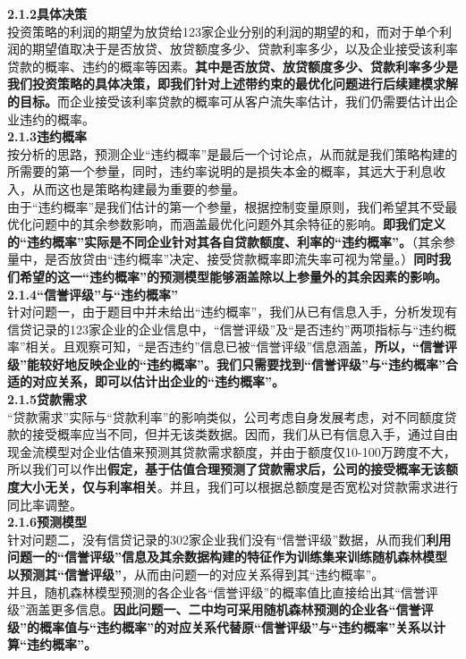 \documentclass[bwprint]{cumcm}
\begin{document}
  \noindent \textbf{2.1.2具体决策}\\
  \indent 投资策略的利润的期望为放贷给123家企业分别的利润的期望的和，而对于单个利润的期望值取决于是否放贷、放贷额度多少、贷款利率多少，以及企业接受该利率贷款的概率、违约的概率等因素。\textbf{其中是否放贷、放贷额度多少、贷款利率多少是我们投资策略的具体决策，即我们针对上述带约束的最优化问题进行后续建模求解的目标。}而企业接受该利率贷款的概率可从客户流失率估计，我们仍需要估计出企业违约的概率。\\
  
   \noindent \textbf{2.1.3违约概率}\\
    \indent 按分析的思路，预测企业“违约概率”是最后一个讨论点，从而就是我们策略构建的所需要的第一个参量，同时，违约率说明的是损失本金的概率，其远大于利息收入，从而这也是策略构建最为重要的参量。\\
    \indent 由于“违约概率”是我们估计的第一个参量，根据控制变量原则，我们希望其不受最优化问题中的其余参数影响，而涵盖最优化问题外其余特征的影响。\textbf{即我们定义的“违约概率”实际是不同企业针对其各自贷款额度、利率的“违约概率”。}（其余参量中，是否放贷由“违约概率”决定、接受贷款概率即流失率可视为常量。）\textbf{同时我们希望的这一“违约概率”的预测模型能够涵盖除以上参量外的其余因素的影响。}\\
    
   \noindent \textbf{2.1.4“信誉评级”与“违约概率”}\\
     \indent 针对问题一，由于题目中并未给出“违约概率”，我们从已有信息入手，分析发现有信贷记录的123家企业的企业信息中，“信誉评级”及“是否违约”两项指标与“违约概率”相关。且观察可知，“是否违约”信息已被“信誉评级”信息涵盖，\textbf{所以，“信誉评级”能较好地反映企业的“违约概率”。我们只需要找到“信誉评级”与“违约概率”合适的对应关系，即可以估计出企业的“违约概率”。}\\
  
      
   \noindent \textbf{2.1.5贷款需求}\\
\indent “贷款需求”实际与“贷款利率”的影响类似，公司考虑自身发展考虑，对不同额度贷款的接受概率应当不同，但并无该类数据。因而，我们从已有信息入手，通过自由现金流模型对企业估值来预测其贷款需求额度，并由于额度仅10-100万跨度不大，所以我们可以作出\textbf{假定，基于估值合理预测了贷款需求后，公司的接受概率无该额度大小无关，仅与利率相关}。并且，我们可以根据总额度是否宽松对贷款需求进行同比率调整。\\
   
   \noindent \textbf{2.1.6预测模型}\\
    \indent 针对问题二，没有信贷记录的302家企业我们没有“信誉评级”数据，从而我们\textbf{利用问题一的“信誉评级”信息及其余数据构建的特征作为训练集来训练随机森林模型以预测其“信誉评级”}，从而由问题一的对应关系得到其“违约概率”。\\
    \indent 并且，随机森林模型预测的各企业各“信誉评级”的概率值比直接给出其“信誉评级”涵盖更多信息。\textbf{因此问题一、二中均可采用随机森林预测的企业各“信誉评级”的概率值与“违约概率”的对应关系代替原“信誉评级”与“违约概率”关系以计算“违约概率”。}\\
  
\end{document}
